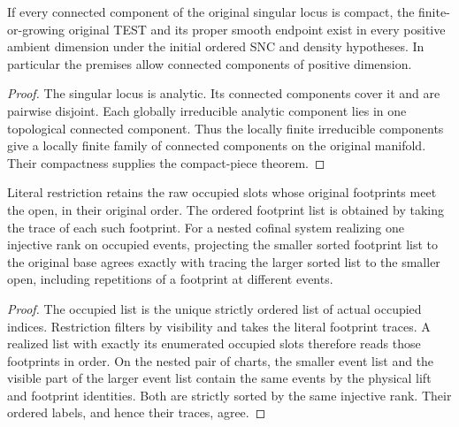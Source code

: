 \begin{corollary}
\label{hir:g8-compact-connected-original-singular}
\leanok
If every connected component of the original singular locus is
compact, the finite-or-growing original TEST and its proper smooth
endpoint exist in every positive ambient dimension under the
initial ordered SNC and density hypotheses. In particular the
premises allow connected components of positive dimension.
\end{corollary}
\begin{proof}
The singular locus is analytic. Its connected components cover it
and are pairwise disjoint. Each globally irreducible analytic
component lies in one topological connected component. Thus the
locally finite irreducible components give a locally finite family
of connected components on the original manifold. Their compactness
supplies the compact-piece theorem.
\end{proof}

\begin{theorem}
\label{hir:g8-ordered-footprint-traces}
\leanok
Literal restriction retains the raw occupied slots whose original
footprints meet the open, in their original order. The ordered
footprint list is obtained by taking the trace of each such footprint.
For a nested cofinal system realizing one injective rank on occupied
events, projecting the smaller sorted footprint list to the original
base agrees exactly with tracing the larger sorted list to the smaller
open, including repetitions of a footprint at different events.
\end{theorem}
\begin{proof}
The occupied list is the unique strictly ordered list of actual
occupied indices. Restriction filters by visibility and takes the
literal footprint traces. A realized list with exactly its enumerated
occupied slots therefore reads those footprints in order. On the
nested pair of charts, the smaller event list and the visible part
of the larger event list contain the same events by the physical
lift and footprint identities. Both are strictly sorted by the same
injective rank. Their ordered labels, and hence their traces, agree.
\end{proof}

